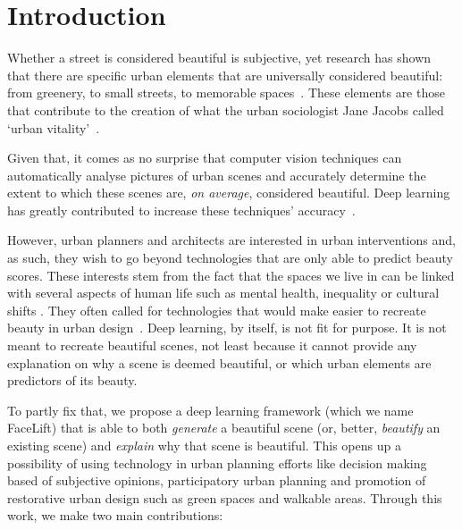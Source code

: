 \section{Introduction}


Whether a street is considered beautiful is subjective, yet research has shown that there are specific urban elements that are universally considered beautiful: from greenery, to small streets, to memorable spaces~\cite{alexander1977pattern, quercia2014aesthetic,salesses2013collaborative}. These elements are those that contribute to the creation of what the urban sociologist Jane Jacobs called `urban vitality'~\cite{jacobs1961death}. 


Given that, it comes as no surprise that computer vision techniques can automatically analyse pictures of urban scenes and accurately determine the extent to which these scenes are, \emph{on average}, considered beautiful.  Deep learning has greatly contributed to increase these techniques' accuracy~\cite{dubey2016deep}.

However, urban planners and architects are interested in urban interventions and, as such, they wish to go beyond technologies that are only able to predict beauty scores. These interests stem from the fact that the spaces we live in can be linked with several aspects of human life such as mental health\cite{seresinhe2015quantifying}, inequality \cite{salesses2013collaborative} or cultural shifts \cite{10.3389/fphy.2018.00027}. They often called for technologies that would make easier to recreate beauty in urban design~\cite{de2008architecture}. Deep learning, by itself, is not fit for purpose. It is not meant to recreate beautiful scenes, not least because it cannot provide any explanation on why a scene is deemed beautiful, or which urban elements are predictors of its beauty.


To partly fix that, we propose a deep learning framework (which we name  FaceLift) that is able to both \emph{generate} a beautiful scene (or, better, \emph{beautify} an existing scene) and \emph{explain} why that scene is beautiful. This opens up a possibility of using technology in urban planning efforts like decision making based of subjective opinions, participatory urban planning and promotion of restorative urban design such as green spaces and walkable areas.  Through this work, we make two main contributions:

